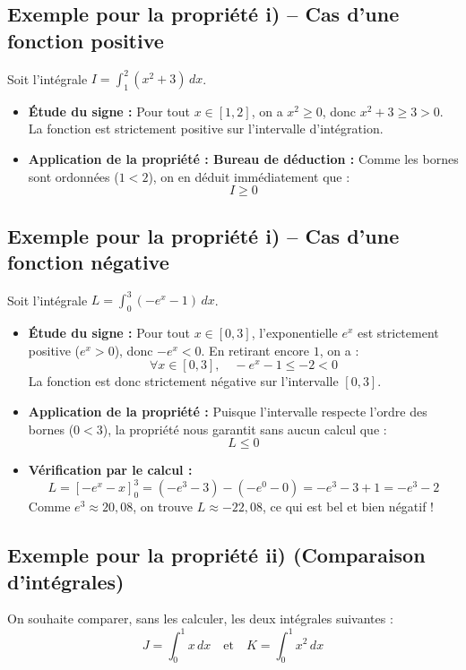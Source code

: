 \documentclass[12pt,a4paper]{article}
\begin{document}
\subsection*{Exemple pour la propriété i) -- Cas d'une fonction positive}
Soit l'intégrale $I = \int_{1}^{2} (x^2 + 3) \, dx$.
\begin{itemize}
    \item \textbf{Étude du signe :} Pour tout $x \in [1, 2]$, on a $x^2 \geq 0$, donc $x^2 + 3 \geq 3 > 0$. La fonction est strictement positive sur l'intervalle d'intégration.
    \item \textbf{Application de la propriété : Bureau de déduction : } Comme les bornes sont ordonnées ($1 < 2$), on en déduit immédiatement que :
    \[ I \geq 0 \]
\end{itemize}

\subsection*{Exemple pour la propriété i) -- Cas d'une fonction négative}
Soit l'intégrale $L = \int_{0}^{3} (-e^x - 1) \, dx$.
\begin{itemize}
    \item \textbf{Étude du signe :} Pour tout $x \in [0, 3]$, l'exponentielle $e^x$ est strictement positive ($e^x > 0$), donc $-e^x < 0$. En retirant encore $1$, on a :
    \[ \forall x \in [0, 3], \quad -e^x - 1 \leq -2 < 0 \]
    La fonction est donc strictement négative sur l'intervalle $[0, 3]$.
    \item \textbf{Application de la propriété :} Puisque l'intervalle respecte l'ordre des bornes ($0 < 3$), la propriété nous garantit sans aucun calcul que :
    \[ L \leq 0 \]
    \item \textbf{Vérification par le calcul :}
    \[ L = \left[ -e^x - x \right]_{0}^{3} = (-e^3 - 3) - (-e^0 - 0) = -e^3 - 3 + 1 = -e^3 - 2 \]
    Comme $e^3 \approx 20,08$, on trouve $L \approx -22,08$, ce qui est bel et bien négatif !
\end{itemize}

\subsection*{Exemple pour la propriété ii) (Comparaison d'intégrales)}
On souhaite comparer, sans les calculer, les deux intégrales suivantes :
\[ J = \int_{0}^{1} x \, dx \quad \text{et} \quad K = \int_{0}^{1} x^2 \, dx \]
\end{document}
